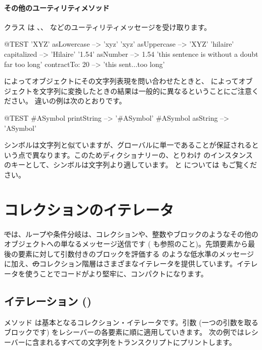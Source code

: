 \documentclass[a4paper,10pt,twoside]{book}
\begin{document}
\paragraph{その他のユーティリティメソッド}
クラス  は 、、 などのユーティリティメッセージを受け取ります。

\begin{code}{@TEST}
'XYZ' asLowercase --> 'xyz'
'xyz' asUppercase   --> 'XYZ'
'hilaire' capitalized   --> 'Hilaire'
'1.54' asNumber      --> 1.54
'this sentence is without a doubt far too long' contractTo: 20 --> 'this sent...too long'
\end{code}

 によってオブジェクトにその文字列表現を問い合わせたときと、 によってオブジェクトを文字列に変換したときの結果は一般的に異なるということにご注意ください。
違いの例は次のとおりです。

\begin{code}{@TEST}
#ASymbol printString --> '#ASymbol'
#ASymbol asString    --> 'ASymbol'
\end{code}

シンボルは文字列と似ていますが、グローバルに単一であることが保証されるという点で異なります。このためディクショナリーの、とりわけ  のインスタンスのキーとして、シンボルは文字列より適しています。
 と  については  もご覧ください。

\section{コレクションのイテレータ}

\st では、ループや条件分岐は、コレクションや、整数やブロックのようなその他のオブジェクトへの単なるメッセージ送信です ( も参照のこと)。先頭要素から最後の要素に対して引数付きのブロックを評価する  のような低水準のメッセージに加え、\st のコレクション階層はさまざまなイテレータを提供しています。イテレータを使うことでコードがより堅牢に、コンパクトになります。

\subsection{イテレーション ()}
メソッド  は基本となるコレクション・イテレータです。引数 (一つの引数を取るブロックです) をレシーバーの各要素に順に適用していきます。
次の例ではレシーバーに含まれるすべての文字列をトランスクリプトにプリントします。
\end{document}
